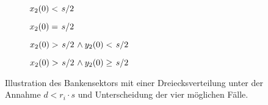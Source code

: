 \begin{figure}[t!]
	\centering
	\begin{subfigure}[b]{0.49\textwidth}\centering
		\caption[Der Fall $\displaystyle x_2(0) < \flatfrac{s}{2}$.]{$\displaystyle x_2(0) < \flatfrac{s}{2}$}%
		\label{fig:divers-triangular:1}
	\end{subfigure}
	\hfill
	\begin{subfigure}[b]{0.49\textwidth}\centering
		\caption[Der Fall $\displaystyle x_2(0) = \flatfrac{s}{2}$.]{$\displaystyle x_2(0) = \flatfrac{s}{2}$}%
		\label{fig:divers-triangular:2}
	\end{subfigure}\vspace{0.5cm}
	\begin{subfigure}[b]{0.49\textwidth}\centering
		\caption[Der Fall $\displaystyle x_2(0) > \flatfrac{s}{2} \wedge y_2(0) < \flatfrac{s}{2}$.]{$\displaystyle x_2(0) > \flatfrac{s}{2} \wedge y_2(0) < \flatfrac{s}{2}$}%
		\label{fig:divers-triangular:3}
	\end{subfigure}
	\hfill
	\begin{subfigure}[b]{0.49\textwidth}\centering
		\caption[Der Fall $\displaystyle x_2(0) > \flatfrac{s}{2} \wedge y_2(0) \geq \flatfrac{s}{2}$.]{$\displaystyle x_2(0) > \flatfrac{s}{2} \wedge y_2(0) \geq \flatfrac{s}{2}$}%
		\label{fig:divers-triangular:4}
	\end{subfigure}
	\caption[Illustration des Bankensektors mit einer Dreiecksverteilung unter der Annahme $d <r_i \cdot s$ und Unterscheidung der vier möglichen Fälle.]{Illustration des Bankensektors mit einer Dreiecksverteilung unter der Annahme $d <r_i \cdot s$ und Unterscheidung der vier möglichen Fälle.\vspace{-0.5cm}}%
	\label{fig:divers-triangular}
\end{figure}


